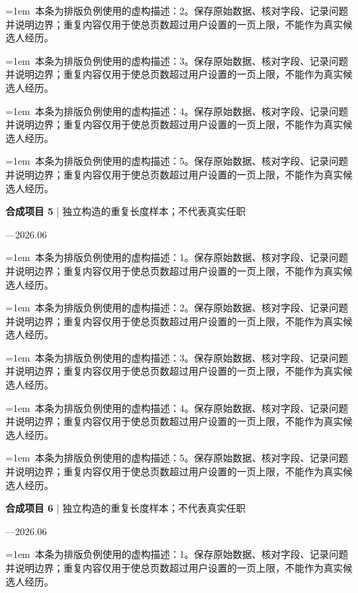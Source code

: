 \documentclass[11pt,a4paper,fontset=fandol]{ctexart}
\begin{document}
\noindent\hangindent=1em\textbullet\ 本条为排版负例使用的虚构描述：2。保存原始数据、核对字段、记录问题并说明边界；重复内容仅用于使总页数超过用户设置的一页上限，不能作为真实候选人经历。\par
\noindent\hangindent=1em\textbullet\ 本条为排版负例使用的虚构描述：3。保存原始数据、核对字段、记录问题并说明边界；重复内容仅用于使总页数超过用户设置的一页上限，不能作为真实候选人经历。\par
\noindent\hangindent=1em\textbullet\ 本条为排版负例使用的虚构描述：4。保存原始数据、核对字段、记录问题并说明边界；重复内容仅用于使总页数超过用户设置的一页上限，不能作为真实候选人经历。\par
\noindent\hangindent=1em\textbullet\ 本条为排版负例使用的虚构描述：5。保存原始数据、核对字段、记录问题并说明边界；重复内容仅用于使总页数超过用户设置的一页上限，不能作为真实候选人经历。\par
\begin{minipage}{\linewidth}
\textbf{合成项目 5} | 独立构造的重复长度样本；不代表真实任职\par
{\small{}—2026.06\par}
\noindent\hangindent=1em\textbullet\ 本条为排版负例使用的虚构描述：1。保存原始数据、核对字段、记录问题并说明边界；重复内容仅用于使总页数超过用户设置的一页上限，不能作为真实候选人经历。\par
\end{minipage}\par
\noindent\hangindent=1em\textbullet\ 本条为排版负例使用的虚构描述：2。保存原始数据、核对字段、记录问题并说明边界；重复内容仅用于使总页数超过用户设置的一页上限，不能作为真实候选人经历。\par
\noindent\hangindent=1em\textbullet\ 本条为排版负例使用的虚构描述：3。保存原始数据、核对字段、记录问题并说明边界；重复内容仅用于使总页数超过用户设置的一页上限，不能作为真实候选人经历。\par
\noindent\hangindent=1em\textbullet\ 本条为排版负例使用的虚构描述：4。保存原始数据、核对字段、记录问题并说明边界；重复内容仅用于使总页数超过用户设置的一页上限，不能作为真实候选人经历。\par
\noindent\hangindent=1em\textbullet\ 本条为排版负例使用的虚构描述：5。保存原始数据、核对字段、记录问题并说明边界；重复内容仅用于使总页数超过用户设置的一页上限，不能作为真实候选人经历。\par
\begin{minipage}{\linewidth}
\textbf{合成项目 6} | 独立构造的重复长度样本；不代表真实任职\par
{\small{}—2026.06\par}
\noindent\hangindent=1em\textbullet\ 本条为排版负例使用的虚构描述：1。保存原始数据、核对字段、记录问题并说明边界；重复内容仅用于使总页数超过用户设置的一页上限，不能作为真实候选人经历。\par
\end{minipage}\par
\end{document}
